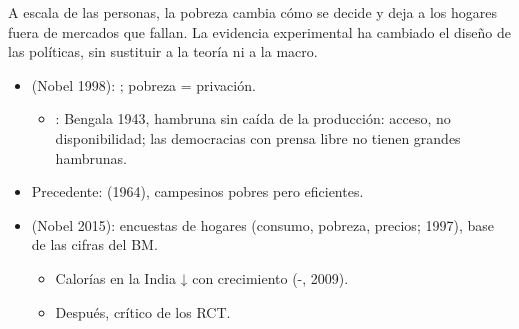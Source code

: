 \documentclass{article}
\begin{document}
\begin{columnas}
\begin{ideaclave}
A escala de las personas, la pobreza cambia cómo se decide y deja a los hogares fuera de mercados que fallan. La evidencia experimental ha cambiado el diseño de las políticas, sin sustituir a la teoría ni a la macro.
\end{ideaclave}

\begin{itemize}
\item \textbf{} (Nobel 1998): ; pobreza = privación.
  \begin{itemize}
  \item {}: Bengala 1943, hambruna sin caída de la producción: acceso, no disponibilidad; las democracias con prensa libre no tienen grandes hambrunas.
  \end{itemize}
\item Precedente:  (1964), campesinos pobres pero eficientes.
\item \textbf{} (Nobel 2015): encuestas de hogares (consumo, pobreza, precios; 1997), base de las cifras del BM.
  \begin{itemize}
  \item Calorías en la India ↓ con crecimiento (-, 2009).
  \item Después, crítico de los RCT.
  \end{itemize}
\end{itemize}


\end{columnas}
\end{document}
